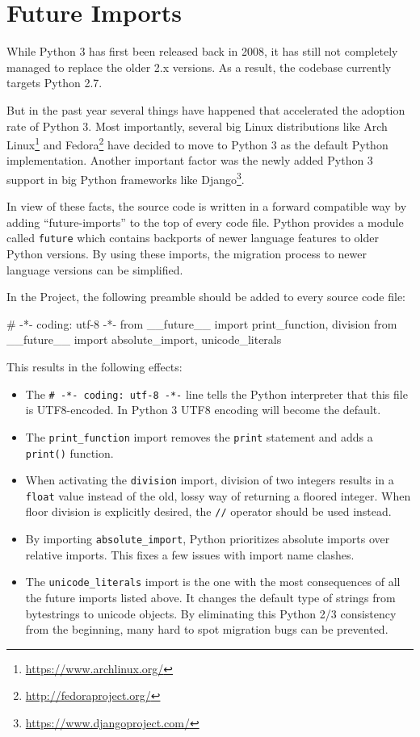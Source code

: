 \section{Future Imports}

While Python 3 has first been released back in 2008, it has still not completely
managed to replace the older 2.x versions. As a result, the \tangible{} codebase
currently targets Python 2.7.

But in the past year several things have happened that accelerated the adoption
rate of Python 3. Most importantly, several big Linux distributions like Arch
Linux\footnote{\url{https://www.archlinux.org/}} and
Fedora\footnote{\url{http://fedoraproject.org/}} have decided to move to Python
3 as the default Python implementation. Another important factor was the newly
added Python 3 support in big Python frameworks like
Django\footnote{\url{https://www.djangoproject.com/}}.

In view of these facts, the \tangible{} source code is written in a forward
compatible way by adding ``future-imports'' to the top of every code file.
Python provides a module called \texttt{future} which contains backports of
newer language features to older Python versions. By using these imports, the
migration process to newer language versions can be simplified.

In the \tangible{} Project, the following preamble should be added to every
source code file:

\vspace{.5\baselineskip}
\begin{pythoncode}
# -*- coding: utf-8 -*-
from __future__ import print_function, division
from __future__ import absolute_import, unicode_literals
\end{pythoncode}

\noindent This results in the following effects:

\begin{itemize}
	\item The \texttt{\# -*- coding: utf-8 -*-} line tells the Python interpreter
		that this file is UTF8-encoded. In Python 3 UTF8 encoding will become the
		default.
	\item The \texttt{print\_function} import removes the \texttt{print} statement
		and adds a \texttt{print()} function.
	\item When activating the \texttt{division} import, division of two integers
		results in a \texttt{float} value instead of the old, lossy way of returning
		a floored integer. When floor division is explicitly desired, the
		\texttt{//} operator should be used instead.
	\item By importing \texttt{absolute\_import}, Python prioritizes absolute
		imports over relative imports. This fixes a few issues with import name
		clashes.
	\item The \texttt{unicode\_literals} import is the one with the most
		consequences of all the future imports listed above. It changes the default
		type of strings from bytestrings to unicode objects. By eliminating this
		Python 2/3 consistency from the beginning, many hard to spot migration bugs
		can be prevented.
\end{itemize}

